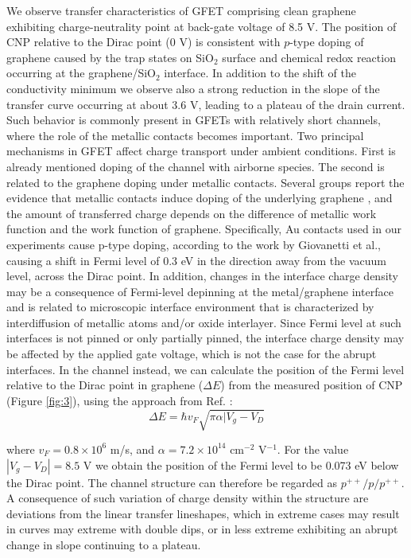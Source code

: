 \documentclass[preprint,aip,jap]{revtex4-2}
\begin{document}
We observe transfer characteristics of GFET comprising clean graphene exhibiting charge-neutrality point at back-gate voltage of 8.5 V.  The position of CNP relative to the Dirac point (0 V) is consistent with $p$-type doping of graphene caused by the trap states on SiO$_{2}$ surface and chemical redox reaction occurring at the graphene/SiO$_{2}$ interface\cite{feng-2014,peng-2017,lafkioti-2010}.  In addition to the shift of the conductivity minimum we observe also a strong reduction in the slope of the transfer curve occurring at about 3.6 V, leading to a plateau of the drain current.  Such behavior is commonly present in GFETs with relatively short channels, where the role of the metallic contacts becomes important\cite{bartolomeo-2015,nouchi-2008,nouchi-2014}. Two principal mechanisms in GFET affect charge transport under ambient conditions. First is already mentioned doping of the channel with airborne species. The second is related to the graphene doping under metallic contacts\cite{farmer-2009,giovannetti-2008,lee-2008,mueller-2009}.  Several groups report the evidence that metallic contacts induce doping of the underlying graphene \cite{giovannetti-2008,mueller-2009,huard-2008}, and the amount of transferred charge depends on the difference of metallic work function and the work function of graphene.  Specifically, Au contacts used in our experiments cause p-type doping, according to the work by Giovanetti et al.\cite{giovannetti-2008}, causing a shift in Fermi level of 0.3 eV in the direction away from the vacuum level, across the Dirac point. In addition, changes in the interface charge density may be a consequence of Fermi-level depinning at the metal/graphene interface and is related to microscopic interface environment that is characterized by interdiffusion of metallic atoms and/or oxide interlayer\cite{nouchi-2008,nouchi-2014}. Since Fermi level at such interfaces is not pinned or only partially pinned\cite{dibartolomeo-2011}, the interface charge density may be affected by the applied gate voltage, which is not the case for the abrupt interfaces.  In the channel instead, we can calculate the position of the Fermi level relative to the Dirac point in graphene ($\Delta E$) from the measured position of CNP (Figure \ref{fig:3}), using the approach from Ref. :
\begin{equation}
  \label{eq:1}
  \Delta E = \hbar v_{F}\sqrt{\pi\alpha|V_{g}-V_{D}}
\end{equation}

where $v_F=0.8\times10^6$ m/s, and $\alpha=7.2\times10^{14}$ cm$^{-2}$ V$^{-1}$. For the value $|V_g-V_D |=8.5$ V we obtain the position of the Fermi level to be 0.073 eV below the Dirac point. The channel structure can therefore be regarded as $p^{++}/p/p^{++}$. A consequence of such variation of charge density within the structure are deviations from the linear transfer lineshapes, which in extreme cases may result in curves may extreme with double dips\cite{nouchi-2014,nam-2012}, or in less extreme exhibiting an abrupt change in slope continuing to a plateau. 
\end{document}
